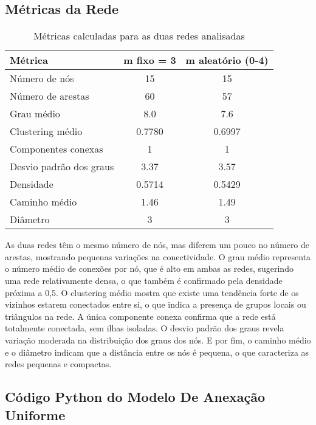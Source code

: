 \documentclass{article}
\begin{document}
\subsection*{Métricas da Rede}

\begin{table}[h]
\centering
\begin{tabular}{|l|c|c|}
\hline
\textbf{Métrica} & \textbf{m fixo = 3} & \textbf{m aleatório (0-4)} \\
\hline
Número de nós & 15 & 15 \\
Número de arestas & 60 & 57 \\
Grau médio & 8.0 & 7.6 \\
Clustering médio & 0.7780 & 0.6997 \\
Componentes conexas & 1 & 1 \\
Desvio padrão dos graus & 3.37 & 3.57 \\
Densidade & 0.5714 & 0.5429 \\
Caminho médio & 1.46 & 1.49 \\
Diâmetro & 3 & 3 \\
\hline
\end{tabular}
\caption{Métricas calculadas para as duas redes analisadas}
\label{tab:metricas_rede_pequenas}
\end{table}

As duas redes têm o mesmo número de nós, mas diferem um pouco no número de arestas, mostrando pequenas variações na conectividade. O grau médio representa o número médio de conexões por nó, que é alto em ambas as redes, sugerindo uma rede relativamente densa, o que também é confirmado pela densidade próxima a 0,5. O clustering médio mostra que existe uma tendência forte de os vizinhos estarem conectados entre si, o que indica a presença de grupos locais ou triângulos na rede. A única componente conexa confirma que a rede está totalmente conectada, sem ilhas isoladas. O desvio padrão dos graus revela variação moderada na distribuição dos graus dos nós. E por fim, o caminho médio e o diâmetro indicam que a distância entre os nós é pequena, o que caracteriza as redes pequenas e compactas.
\newpage

\subsection{Código Python do Modelo De Anexação Uniforme}
\end{document}
